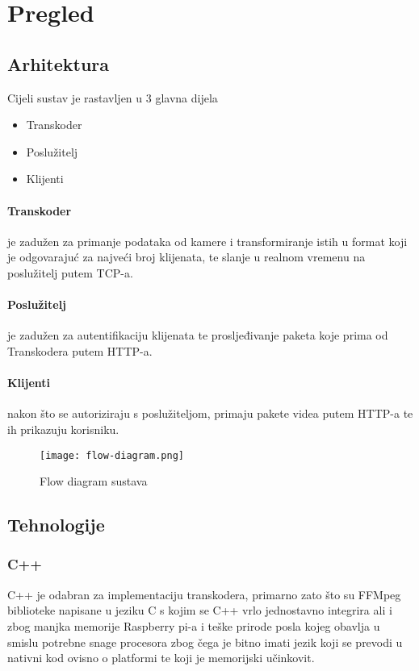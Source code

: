 \section{Pregled}

\subsection{Arhitektura}
Cijeli sustav je rastavljen u 3 glavna dijela
\begin{itemize}
  \item Transkoder
  \item Poslužitelj
  \item Klijenti
\end{itemize}
\paragraph{Transkoder}
je zadužen za primanje podataka od kamere i transformiranje istih u format koji je odgovarajuć za najveći broj klijenata, 
te slanje u realnom vremenu na poslužitelj putem TCP-a.
\paragraph{Poslužitelj}
je zadužen za autentifikaciju klijenata te prosljeđivanje paketa koje prima od Transkodera putem HTTP-a.
\paragraph{Klijenti}
nakon što se autoriziraju s poslužiteljom, primaju pakete videa putem HTTP-a te ih prikazuju korisniku.
\begin{figure}[h]
  \centering
  \texttt{[image: flow-diagram.png]}
  \caption{Flow diagram sustava}
\end{figure}

\clearpage
\subsection{Tehnologije}

\subsubsection{C++}
C++ je odabran za implementaciju transkodera, primarno zato što su FFMpeg biblioteke napisane u jeziku C 
s kojim se C++ vrlo jednostavno integrira ali i zbog manjka memorije Raspberry pi-a i teške prirode posla kojeg obavlja
u smislu potrebne snage procesora zbog čega je bitno imati jezik koji se prevodi u nativni kod ovisno o platformi te koji
je memorijski učinkovit. \cite{bStrou}

